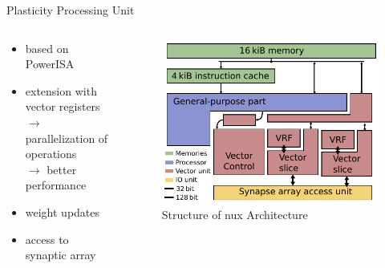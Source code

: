 \documentclass[10pt,aspectratio=169]{beamer}
\begin{document}
\begin{frame}{Plasticity Processing Unit}
    \begin{columns}[c]
    \begin{column}{0.5\textwidth}
        \begin{itemize}
			\setlength\itemsep{1em}
			\item based on PowerISA
            \item extension with vector registers \\ \hspace{10mm}
				$\rightarrow$ parallelization of operations\\ \hspace{10mm}
				$\rightarrow$ better performance
            \item weight updates
			\item access to synaptic array
        \end{itemize}
    \end{column}

    \begin{column}{0.5\textwidth}
        \centering
        \begin{figure}
            \includegraphics[width=.8\textwidth]{pictures/nux.pdf}
            \caption{\label{fig:nux} Structure of nux Architecture}
        \end{figure}
    \end{column}
    \end{columns}
\end{frame}
\end{document}
